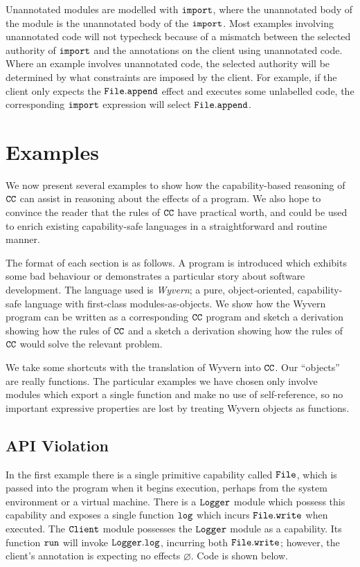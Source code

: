 Unannotated modules are modelled with $\mathtt{import}$, where the unannotated body of the module is the unannotated body of the $\mathtt{import}$. Most examples involving unannotated code will not typecheck because of a mismatch between the selected authority of $\mathtt{import}$ and the annotations on the client using unannotated code. Where an example involves unannotated code, the selected authority will be determined by what constraints are imposed by the client. For example, if the client only expects the $\mathtt{File.append}$ effect and executes some unlabelled code, the corresponding $\mathtt{import}$ expression will select $\mathtt{File.append}$.

\section{Examples}

We now present several examples to show how the capability-based reasoning of $\mathtt{CC}$ can assist in reasoning about the effects of a program. We also hope to convince the reader that the rules of $\mathtt{CC}$ have practical worth, and could be used to enrich existing capability-safe languages in a straightforward and routine manner.

The format of each section is as follows. A program is introduced which exhibits some bad behaviour or demonstrates a particular story about software development. The language used is \textit{Wyvern}; a pure, object-oriented, capability-safe language with first-class modules-as-objects. We show how the Wyvern program can be written as a corresponding $\mathtt{CC}$ program and sketch a derivation showing how the rules of $\mathtt{CC}$ and a sketch a derivation showing how the rules of $\mathtt{CC}$ would solve the relevant problem.

We take some shortcuts with the translation of Wyvern into $\mathtt{CC}$. Our ``objects'' are really functions. The particular examples we have chosen only involve modules which export a single function and make no use of self-reference, so no important expressive properties are lost by treating Wyvern objects as functions.


\subsection{API Violation}

In the first example there is a single primitive capability called $\mathtt{File}$, which is passed into the program when it begins execution, perhaps from the system environment or a virtual machine. There is a $\mathtt{Logger}$ module which possess this capability and exposes a single function $\mathtt{log}$ which incurs $\mathtt{File.write}$ when executed. The $\mathtt{Client}$ module possesses the $\mathtt{Logger}$ module as a capability. Its function $\mathtt{run}$ will invoke $\mathtt{Logger.log}$, incurring both $\mathtt{File.write}$; however, the client's annotation is expecting no effects $\varnothing$. Code is shown below.

